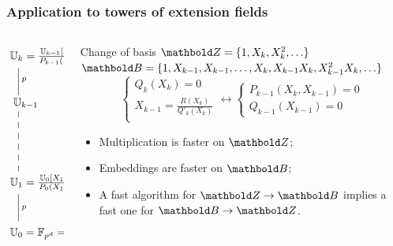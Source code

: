 \documentclass[10pt]{beamer}
\begin{document}
\begin{frame}
  \frametitle{Application to towers of extension fields}
  
    \begin{columns}
    \begin{column}{0.3\textwidth}
      \Large\[\xymatrix{
        *+[r]{\U_k = \frac{\U_{k-1}[X_k]}{P_{k-1}(X_k)}}\ar@{-}[d]^p\\
        *+[r]{\U_{k-1}} \ar@{--}[dd]\\
        \\
        *+[r]{\U_1 = \frac{\U_0[X_1]}{P_0(X_1)}} \ar@{-}[d]^p\\
        *+[r]{\U_0 = \F_{p^d} = \frac{\F_p[X_0]}{Q(X_0)}}
      }\]
    \end{column}
    \begin{column}{0.65\textwidth}
      \begin{block}{Change of basis}
        $\basis{Z} = \{1,X_k,X_k^2,\ldots\}$
        $\basis{B} = \{1,X_{k-1},X_{k-1},\ldots,X_k,X_{k-1}X_k,X_{k-1}^2X_k,\ldots\}$
        \[
        \begin{cases}
          Q_{k}(X_{k})=0\\
          X_{k-1} = \frac{R(X_k)}{Q'_k(X_k)}\\
        \end{cases}
        \leftrightarrow
        \begin{cases}
          P_{k-1}(X_k,X_{k-1}) = 0\\
          Q_{k-1}(X_{k-1}) = 0
        \end{cases}\]
        \begin{itemize}
        \item Multiplication is faster on $\basis{Z}$;
        \item Embeddings are faster on $\basis{B}$;
        \item A fast algorithm for $\basis{Z}\ra\basis{B}$ implies a
          fast one for $\basis{B}\ra\basis{Z}$.
        \end{itemize}
      \end{block}
    \end{column}
  \end{columns}
\end{frame}
\end{document}

